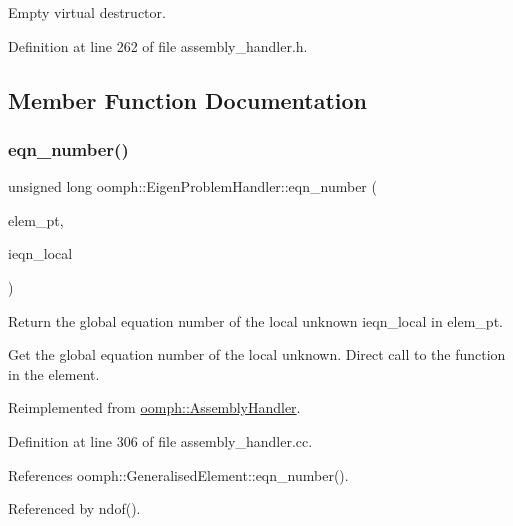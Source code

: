 Empty virtual destructor. 



Definition at line 262 of file assembly\+\_\+handler.\+h.



\subsection{Member Function Documentation}
\mbox{\label{classoomph_1_1EigenProblemHandler_ab94bef9c8135c9d2701e96d8205c797d}} 
\subsubsection{\texorpdfstring{eqn\+\_\+number()}{eqn\_number()}}
{\footnotesize\ttfamily unsigned long oomph\+::\+Eigen\+Problem\+Handler\+::eqn\+\_\+number (\begin{DoxyParamCaption}\item[{\hyperlink{classoomph_1_1GeneralisedElement}{Generalised\+Element} $\ast$const \&}]{elem\+\_\+pt,  }\item[{const unsigned \&}]{ieqn\+\_\+local }\end{DoxyParamCaption})\hspace{0.3cm}{\ttfamily [virtual]}}



Return the global equation number of the local unknown ieqn\+\_\+local in elem\+\_\+pt. 

Get the global equation number of the local unknown. Direct call to the function in the element. 

Reimplemented from \hyperlink{classoomph_1_1AssemblyHandler_a94d28e2de2559cde803d1ba2195b5290}{oomph\+::\+Assembly\+Handler}.



Definition at line 306 of file assembly\+\_\+handler.\+cc.



References oomph\+::\+Generalised\+Element\+::eqn\+\_\+number().



Referenced by ndof().

\mbox{\label{classoomph_1_1EigenProblemHandler_aa88f56b5c724c41e0c2926434ae920da}} 
